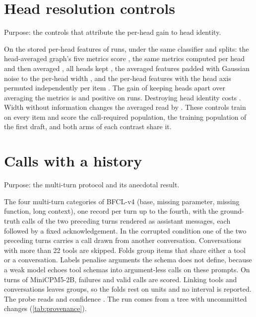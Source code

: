 \section{Head resolution controls}
\label{app:ladder}

Purpose: the controls that attribute the per-head gain to head identity.

On the stored per-head features of \ladNRuns{} runs, under the same classifier and splits: the head-averaged graph's five metrics score \ladGraphAvg{}, the same metrics computed per head and then averaged \ladMetricAvg{}, all heads kept \ladPerHead{}, the averaged features padded with Gaussian noise to the per-head width \ladNoisePadded{}, and the per-head features with the head axis permuted independently per item \ladHeadShuffled{}. The gain of keeping heads apart over averaging the metrics is \ladGainPerHead{} and positive on \ladGainPerHeadPos{} runs. Destroying head identity costs \ladGainVsShuffle{}. Width without information changes the averaged read by \ladNoiseEffect{}. These controls train on every item and score the call-required population, the training population of the first draft, and both arms of each contrast share it.

\section{Calls with a history}
\label{app:multiturn}

Purpose: the multi-turn protocol and its anecdotal result.

The four multi-turn categories of BFCL-v4 (base, missing parameter, missing function, long context), one record per turn up to the fourth, with the ground-truth calls of the two preceding turns rendered as assistant messages, each followed by a fixed acknowledgement. In the corrupted condition one of the two preceding turns carries a call drawn from another conversation. Conversations with more than 22 tools are skipped. Folds group items that share either a tool or a conversation. Labels penalise arguments the schema does not define, because a weak model echoes tool schemas into argument-less calls on these prompts. On \mtN{} turns of MiniCPM5-2B, \mtPosAll{} failures and \mtNegAll{} valid calls are scored. Linking tools and conversations leaves \mtGroupsAll{} groups, so the folds rest on \mtGroupsAll{} units and no interval is reported. The probe reads \mtAucProbe{} and confidence \mtAucConf{}. The run comes from a tree with uncommitted changes (\cref{tab:provenance}).

